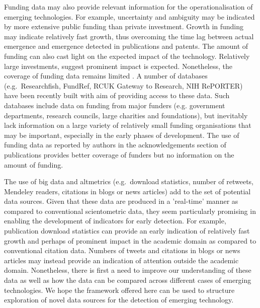 \documentclass[11pt]{article}
\begin{document}
Funding data may also provide relevant information for the operationalisation of emerging technologies. For example, uncertainty and ambiguity may be indicated by more extensive public funding than private investment. Growth in funding may indicate relatively fast growth, thus overcoming the time lag between actual emergence and emergence detected in publications and patents. The amount of funding can also cast light on the expected impact of the technology. Relatively large investments, suggest prominent impact is expected. Nonetheless, the coverage of funding data remains limited \citep{Hopkins2013}. A number of databases (e.g.\ Researchfish, FundRef, RCUK Gateway to Research, NIH RePORTER) have been recently built with aim of providing access to these data. Such databases include data on funding from major funders (e.g. government departments, research councils, large charities and foundations), but inevitably lack information on a large variety of relatively small funding organisations that may be important, especially in the early phases of development. The use of funding data as reported by authors in the acknowledgements section of publications provides better coverage of funders but no information on the amount of funding. 

The use of big data and altmetrics (e.g.\ download statistics, number of retweets, Mendeley readers, citations in blogs or news articles) add to the set of potential data sources. Given that these data are produced in a 'real-time' manner as compared to conventional scientometric data, they seem particularly promising in enabling the development of indicators for early detection. For example, publication download statistics can provide an early indication of relatively fast growth and perhaps of prominent impact in the academic domain as compared to conventional citation data. Numbers of tweets and citations in blogs or news articles may instead provide an indication of attention outside the academic domain. Nonetheless, there is first a need to improve our understanding of these data as well as how the data can be compared across different cases of emerging technologies. We hope the framework offered here can be used to structure exploration of novel data sources for the detection of emerging technology.
\end{document}
